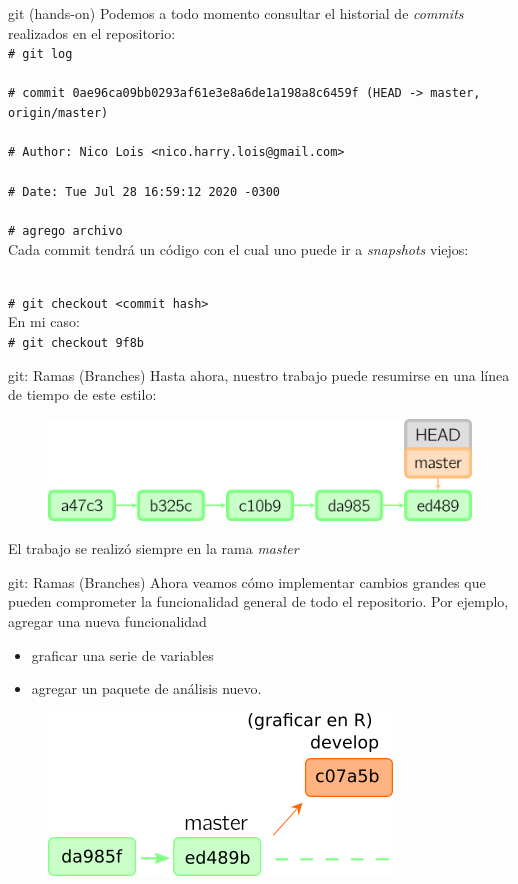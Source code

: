 \documentclass{beamer}
\newcommand{\shellcmd}[1]{\\\indent\indent\texttt{\footnotesize\# #1}\\}
\begin{document}
\begin{frame}{git (hands-on)}
\noindent Podemos a todo momento consultar el historial de \textit{commits} realizados en el repositorio:
\shellcmd{git log}
\shellcmd{commit 0ae96ca09bb0293af61e3e8a6de1a198a8c6459f (HEAD -> master, origin/master)}
  \vspace{-.5cm}
\shellcmd{Author: Nico Lois <nico.harry.lois@gmail.com>}
  \vspace{-.5cm}
\shellcmd{Date:   Tue Jul 28 16:59:12 2020 -0300}
  \vspace{-.5cm}
\shellcmd{agrego archivo}

Cada commit tendrá un código con el cual uno puede ir a \textit{snapshots} viejos:

\shellcmd{git checkout <commit hash>}

En mi caso:
\shellcmd{git checkout 9f8b}
\end{frame}


\begin{frame}{git: Ramas (Branches)}
Hasta ahora, nuestro trabajo puede resumirse en una línea de tiempo de este estilo:
\begin{figure}
    \centering
    \includegraphics[scale=0.65]{master.png}
\end{figure}

El trabajo se realizó siempre en la rama \textit{master}
\end{frame}


\begin{frame}{git: Ramas (Branches)}
Ahora veamos cómo implementar cambios grandes que pueden comprometer la funcionalidad general de todo el repositorio. Por ejemplo, agregar una nueva funcionalidad
\begin{itemize}
    \item graficar una serie de variables
    \item agregar un paquete de análisis nuevo.
\end{itemize}

\begin{figure}
    \centering
    \includegraphics[scale=0.65]{branch.png}
\end{figure}

\end{frame}
\end{document}
